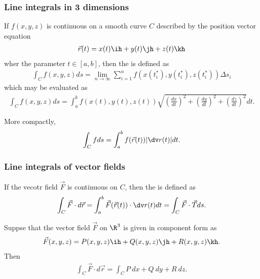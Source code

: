 \documentclass{article}
\begin{document}
\subsubsection{Line integrals in 3 dimensions}

\begin{definition}
    If $f(x,y,z)$ is continuous on a smooth curve $C$ described by the
    position vector equation
    \begin{align*}
        \vec r(t) = x(t)\ih + y(t)\jh + z(t)\kh
    \end{align*}
    wher the parameter $t\in[a,b]$, then the 
    is defined as
    \begin{align*}
        \int_C f(x,y,z)ds = \lim_{n\to\infty}\sum_{i=1}^n f(x(t_i^*), y(t_i^*), z(t_i^*))\Delta s_i
    \end{align*}
    which may be evaluated as
    \begin{align*}
        \int_C f(x,y,z)ds = \int_a^b f(x(t), y(t), z(t))\sqrt{\left(\frac{dx}{dt}\right)^2 + \left(\frac{dy}{dt}\right)^2 + \left(\frac{dz}{dt}\right)^2}dt.
    \end{align*}
\end{definition}
\begin{lemma}
    More compactly,
    \begin{align*}
        \int_C f ds = \int_a^b f(\vec r(t))|\dv r(t)|dt.
    \end{align*}
\end{lemma}

\subsubsection{Line integrals of vector fields}

\begin{definition}
    If the vecotr field $\vec F$ is continuous on $C$, then the
     is defined as
    \begin{align*}
        \int_C \vec F\cdot d\vec r = \int_a^b \vec F(\vec r(t))\cdot \dv r(t)dt
        = \int_C \vec F\cdot \vec T ds.
    \end{align*}
\end{definition}
\begin{theorem}
    Suppse that the vector field $\vec F$ on $\R^3$ is given in component
    form as
    \begin{align*}
        \vec F(x,y,z) = P(x,y,z)\ih + Q(x,y,z)\jh + R(x,y,z)\kh.
    \end{align*}
    Then
    \begin{align*}
        \int_C \vec F\cdot d\vec r = \int_C P\:dx + Q\:dy + R\:dz.
    \end{align*}
\end{theorem}
\end{document}
